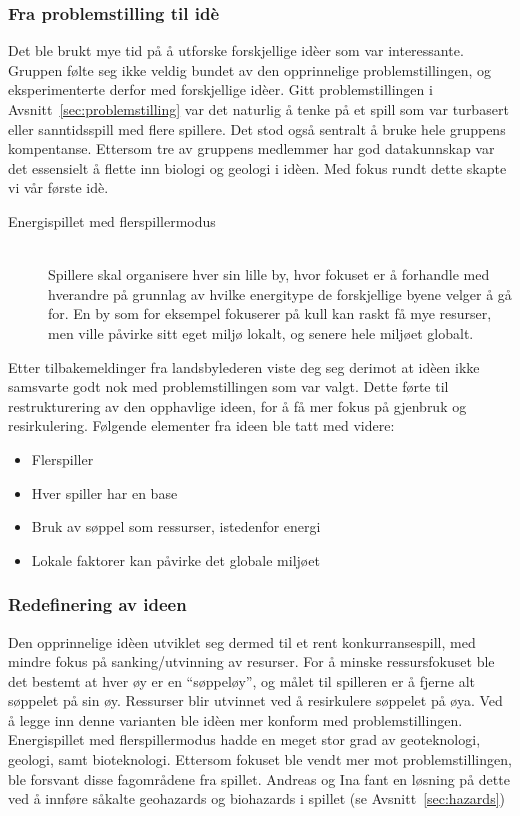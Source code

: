 \subsubsection{Fra problemstilling til idè}
Det ble brukt mye tid på å utforske forskjellige idèer som var
interessante. Gruppen følte seg ikke veldig bundet av den opprinnelige
problemstillingen, og eksperimenterte derfor med forskjellige idèer.
Gitt problemstillingen i Avsnitt~\ref{sec:problemstilling} var det
naturlig å tenke på et spill som var turbasert eller sanntidsspill med
flere spillere. Det stod også sentralt å bruke hele gruppens kompentanse. Ettersom tre av gruppens medlemmer har god datakunnskap var det essensielt å flette inn biologi og geologi i idèen. Med fokus rundt dette skapte vi vår første idè.
\begin{description}
\item[Energispillet med flerspillermodus] \hfill\\
Spillere skal organisere hver sin lille by, hvor fokuset er å forhandle
med hverandre på grunnlag av hvilke energitype de forskjellige byene
velger å gå for. En by som for eksempel fokuserer på kull kan raskt få
mye resurser, men ville påvirke sitt eget miljø lokalt, og senere hele
miljøet globalt.
\end{description}
Etter tilbakemeldinger fra landsbylederen viste deg seg derimot at idèen
ikke samsvarte godt nok med problemstillingen som var valgt. Dette førte
til restrukturering av den opphavlige ideen, for å få mer fokus på
gjenbruk og resirkulering. Følgende elementer fra ideen ble tatt med
videre:
\begin{itemize}
	\item Flerspiller
	\item Hver spiller har en base
	\item Bruk av søppel som ressurser, istedenfor energi
	\item Lokale faktorer kan påvirke det globale miljøet
\end{itemize}
\subsubsection{Redefinering av ideen}
Den opprinnelige idèen utviklet seg dermed til et rent konkurransespill, med
mindre fokus på sanking/utvinning av resurser. For å minske ressursfokuset
ble det bestemt at hver øy er en ``søppeløy'', og målet til spilleren er
å fjerne alt søppelet på sin øy.  Ressurser blir utvinnet ved å
resirkulere søppelet på øya. Ved å legge inn denne varianten ble idèen mer
konform med problemstillingen. Energispillet med flerspillermodus hadde en meget stor grad av geoteknologi, geologi, samt bioteknologi. Ettersom fokuset ble vendt mer mot problemstillingen, ble forsvant disse fagområdene fra spillet. Andreas og Ina fant en løsning på dette ved å innføre såkalte geohazards og biohazards i spillet (se Avsnitt~\ref{sec:hazards})

